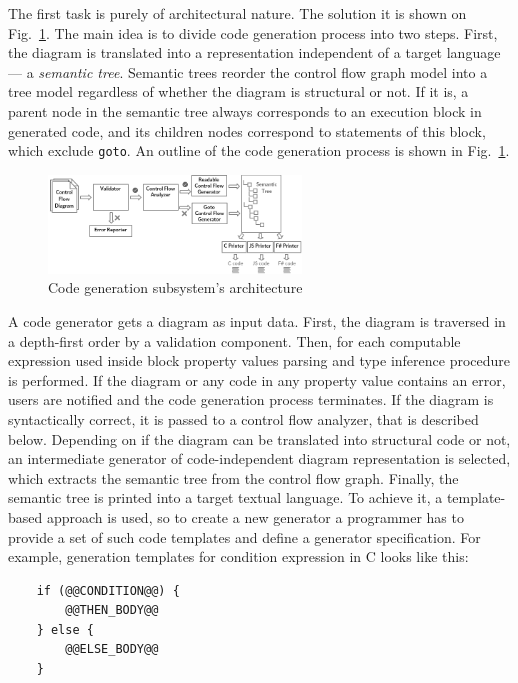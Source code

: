 \documentclass[conference]{IEEEtran}
\begin{document}
The first task is purely of architectural nature. The solution it is shown on Fig.~\ref{image:generatorsArchitecture}. The main idea  is to divide code generation process into two steps. First, the diagram is translated into a representation independent of a target language --- a \textit{semantic tree}. Semantic trees reorder the control flow graph model into a tree model regardless of whether the diagram is structural or not. If it is, a parent node in the semantic tree always corresponds to an execution block in generated code, and its children nodes correspond to statements of this block, which exclude \texttt{goto}. An outline of the code generation process is shown in Fig.~\ref{image:generatorsArchitecture}.

\begin{figure}[ht]
    \includegraphics[width=0.6\textwidth]{TS_Generators_Architecture.png}
    \caption{Code generation subsystem's architecture}
    \label{image:generatorsArchitecture}
\end{figure}

A code generator gets a diagram as input data. First, the diagram is traversed in a depth-first order by a validation component. Then, for each computable expression used inside block property values parsing and type inference procedure is performed. If the diagram or any code in any property value contains an error, users are notified and the code generation process terminates. If the diagram is syntactically correct, it is passed to a control flow analyzer, that is described below. Depending on if the diagram can be translated into structural code or not, an intermediate generator of code-independent diagram representation is selected, which extracts the semantic tree from the control flow graph. Finally, the semantic tree is printed into a target textual language. To achieve it, a template-based approach is used, so to create a new generator a programmer has to provide a set of such code templates and define a generator specification. For example, generation templates for condition expression in C looks like this:
\begin{verbatim}
    if (@@CONDITION@@) {
        @@THEN_BODY@@
    } else {
        @@ELSE_BODY@@
    }
\end{verbatim}
\end{document}

